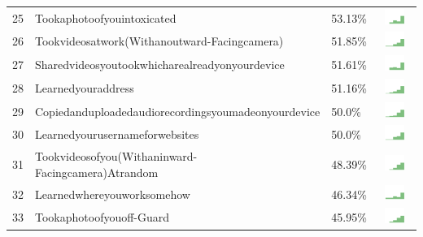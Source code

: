 \documentclass[a4paper,12pt]{article}
\begin{document}
\begin{longtable}{| p{0.5cm} | p{7cm} | p{1cm} | c |}
25 & Tookaphotoofyouintoxicated & 53.13\% & \includegraphics[width = 2cm, height = 0.5cm]{tookaphotoofyouintoxicatedAPPSERVER} \\ 
26 & Tookvideosatwork(Withanoutward-Facingcamera) & 51.85\% & \includegraphics[width = 2cm, height = 0.5cm]{tookvideosatwork(withanoutward-facingcamera)APPSERVER} \\ 
27 & Sharedvideosyoutookwhicharealreadyonyourdevice & 51.61\% & \includegraphics[width = 2cm, height = 0.5cm]{sharedvideosyoutookwhicharealreadyonyourdeviceAPPSERVER} \\ 
28 & Learnedyouraddress & 51.16\% & \includegraphics[width = 2cm, height = 0.5cm]{learnedyouraddressAPPSERVER} \\ 
29 & Copiedanduploadedaudiorecordingsyoumadeonyourdevice & 50.0\% & \includegraphics[width = 2cm, height = 0.5cm]{copiedanduploadedaudiorecordingsyoumadeonyourdeviceAPPSERVER} \\ 
30 & Learnedyourusernameforwebsites & 50.0\% & \includegraphics[width = 2cm, height = 0.5cm]{learnedyourusernameforwebsitesAPPSERVER} \\ 
31 & Tookvideosofyou(Withaninward-Facingcamera)Atrandom & 48.39\% & \includegraphics[width = 2cm, height = 0.5cm]{tookvideosofyou(withaninward-facingcamera)atrandomAPPSERVER} \\ 
32 & Learnedwhereyouworksomehow & 46.34\% & \includegraphics[width = 2cm, height = 0.5cm]{learnedwhereyouworksomehowAPPSERVER} \\ 
33 & Tookaphotoofyouoff-Guard & 45.95\% & \includegraphics[width = 2cm, height = 0.5cm]{tookaphotoofyouoff-guardAPPSERVER} \\ 

\end{longtable}
\end{document}

